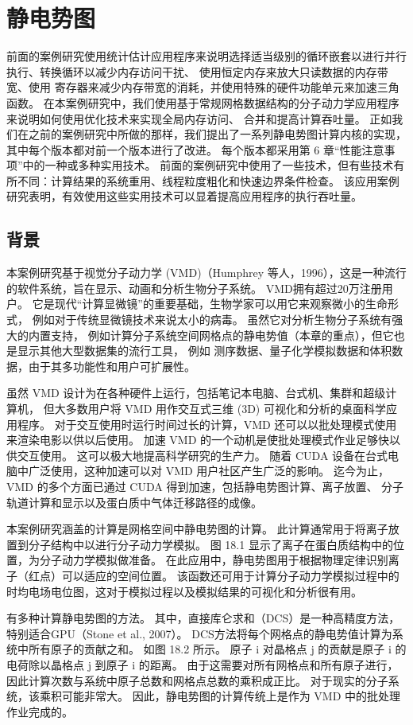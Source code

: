 \section{静电势图}
前面的案例研究使用统计估计应用程序来说明选择适当级别的循环嵌套以进行并行执行、转换循环以减少内存访问干扰、
使用恒定内存来放大只读数据的内存带宽、使用 寄存器来减少内存带宽的消耗，并使用特殊的硬件功能单元来加速三角函数。 
在本案例研究中，我们使用基于常规网格数据结构的分子动力学应用程序来说明如何使用优化技术来实现全局内存访问、
合并和提高计算吞吐量。 正如我们在之前的案例研究中所做的那样，我们提出了一系列静电势图计算内核的实现，
其中每个版本都对前一个版本进行了改进。 每个版本都采用第 6 章“性能注意事项”中的一种或多种实用技术。 
前面的案例研究中使用了一些技术，但有些技术有所不同：计算结果的系统重用、线程粒度粗化和快速边界条件检查。 
该应用案例研究表明，有效使用这些实用技术可以显着提高应用程序的执行吞吐量。

\subsection{背景}
本案例研究基于视觉分子动力学 (VMD)（Humphrey 等人，1996），这是一种流行的软件系统，旨在显示、动画和分析生物分子系统。 
VMD拥有超过20万注册用户。 它是现代“计算显微镜”的重要基础，生物学家可以用它来观察微小的生命形式，
例如对于传统显微镜技术来说太小的病毒。 虽然它对分析生物分子系统有强大的内置支持，
例如计算分子系统空间网格点的静电势值（本章的重点），但它也是显示其他大型数据集的流行工具，
例如 测序数据、量子化学模拟数据和体积数据，由于其多功能性和用户可扩展性。

虽然 VMD 设计为在各种硬件上运行，包括笔记本电脑、台式机、集群和超级计算机，
但大多数用户将 VMD 用作交互式三维 (3D) 可视化和分析的桌面科学应用程序。 
对于交互使用时运行时间过长的计算，VMD 还可以以批处理模式使用来渲染电影以供以后使用。 
加速 VMD 的一个动机是使批处理模式作业足够快以供交互使用。 这可以极大地提高科学研究的生产力。 
随着 CUDA 设备在台式电脑中广泛使用，这种加速可以对 VMD 用户社区产生广泛的影响。 
迄今为止，VMD 的多个方面已通过 CUDA 得到加速，包括静电势图计算、离子放置、
分子轨道计算和显示以及蛋白质中气体迁移路径的成像。

本案例研究涵盖的计算是网格空间中静电势图的计算。 此计算通常用于将离子放置到分子结构中以进行分子动力学模拟。 
图 18.1 显示了离子在蛋白质结构中的位置，为分子动力学模拟做准备。 
在此应用中，静电势图用于根据物理定律识别离子（红点）可以适应的空间位置。 
该函数还可用于计算分子动力学模拟过程中的时均电场电位图，这对于模拟过程以及模拟结果的可视化和分析很有用。

有多种计算静电势图的方法。 其中，直接库仑求和（DCS）是一种高精度方法，特别适合GPU（Stone et al., 2007）。 
DCS方法将每个网格点的静电势值计算为系统中所有原子的贡献之和。 
如图 18.2 所示。 原子 i 对晶格点 j 的贡献是原子 i 的电荷除以晶格点 j 到原子 i 的距离。 
由于这需要对所有网格点和所有原子进行，因此计算次数与系统中原子总数和网格点总数的乘积成正比。 
对于现实的分子系统，该乘积可能非常大。 因此，静电势图的计算传统上是作为 VMD 中的批处理作业完成的。

